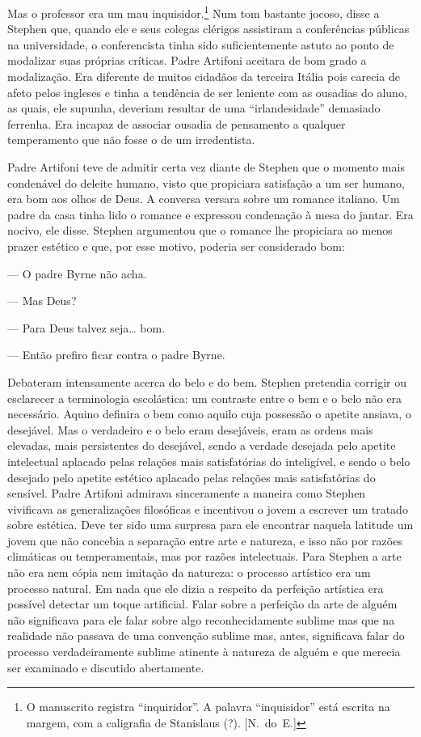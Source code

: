 Mas o professor era um mau inquisidor.\footnote[\setcounter{symbol}{2}]{ O manuscrito registra
“inquiridor”.  A palavra “inquisidor” está escrita na margem, com a caligrafia
de Stanislaus (?). [N.~do~E.]}  Num tom bastante jocoso, disse a Stephen que,
quando ele e seus colegas clérigos assistiram a conferências públicas na
universidade, o conferencista tinha sido suficientemente astuto ao ponto de
modalizar suas próprias críticas.  Padre Artifoni aceitara de bom grado a
modalização.  Era diferente de muitos cidadãos da terceira Itália pois carecia
de afeto pelos ingleses e tinha a tendência de ser leniente com as ousadias do
aluno, as quais, ele supunha, deveriam resultar de uma “irlandesidade”
demasiado ferrenha.  Era incapaz de associar ousadia de pensamento a qualquer
temperamento que não fosse o de um irredentista.

Padre Artifoni teve de admitir certa vez diante de Stephen que o momento mais
condenável do deleite humano, visto que propiciara satisfação a um ser humano,
era bom aos olhos de Deus.  A conversa versara sobre um romance italiano.  Um
padre da casa tinha lido o romance e expressou condenação à mesa do jantar.
Era nocivo, ele disse.  Stephen argumentou que o romance lhe propiciara ao
menos prazer estético e que, por esse motivo, poderia ser considerado bom:

--- O padre Byrne não acha.

--- Mas Deus?

--- Para Deus talvez seja\ldots{} bom.

--- Então prefiro ficar contra o padre Byrne.

Debateram intensamente acerca do belo e do bem.  Stephen pretendia corrigir ou
esclarecer a terminologia escolástica: um contraste entre o bem e o belo não
era necessário.  Aquino definira o bem como aquilo cuja possessão o apetite
ansiava, o desejável.  Mas o verdadeiro e o belo eram desejáveis, eram as
ordens mais elevadas, mais persistentes do desejável, sendo a verdade desejada
pelo apetite intelectual aplacado pelas relações mais satisfatórias do
inteligível, e sendo o belo desejado pelo apetite estético aplacado pelas
relações mais satisfatórias do sensível.  Padre Artifoni admirava sinceramente
a maneira como Stephen vivificava as generalizações filosóficas e incentivou o
jovem a escrever um tratado sobre estética.  Deve ter sido uma surpresa para
ele encontrar naquela latitude um jovem que não concebia a separação entre arte
e natureza, e isso não por razões climáticas ou temperamentais, mas por razões
intelectuais.  Para Stephen a arte não era nem cópia nem imitação da natureza:
o processo artístico era um processo natural.  Em nada que ele dizia a respeito
da perfeição artística era possível detectar um toque artificial.  Falar sobre
a perfeição da arte de alguém não significava para ele falar sobre algo
reconhecidamente sublime mas que na realidade não passava de uma convenção
sublime mas, antes, significava falar do processo verdadeiramente sublime
atinente à natureza de alguém e que merecia ser examinado e discutido
abertamente.

